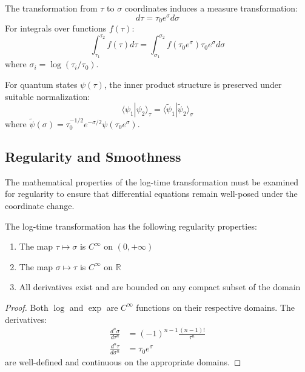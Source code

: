 \begin{theorem}
\label{thm:measure_transformation}
The transformation from $\tau$ to $\sigma$ coordinates induces a measure transformation:
\begin{equation}
d\tau = \tau_0 e^\sigma d\sigma
\end{equation}
For integrals over functions $f(\tau)$:
\begin{equation}
\int_{\tau_1}^{\tau_2} f(\tau) d\tau = \int_{\sigma_1}^{\sigma_2} f(\tau_0 e^\sigma) \tau_0 e^\sigma d\sigma
\end{equation}
where $\sigma_i = \log(\tau_i/\tau_0)$.
\end{theorem}

\begin{corollary}
For quantum states $\psi(\tau)$, the inner product structure is preserved under suitable normalization:
\begin{equation}
\langle \psi_1 | \psi_2 \rangle_\tau = \langle \tilde{\psi}_1 | \tilde{\psi}_2 \rangle_\sigma
\end{equation}
where $\tilde{\psi}(\sigma) = \tau_0^{-1/2} e^{-\sigma/2} \psi(\tau_0 e^\sigma)$.
\end{corollary}

\subsection{Regularity and Smoothness}
\label{subsec:regularity}

The mathematical properties of the log-time transformation must be examined for regularity to ensure that differential equations remain well-posed under the coordinate change.

\begin{theorem}
\label{thm:smoothness}
The log-time transformation has the following regularity properties:
\begin{enumerate}
\item The map $\tau \mapsto \sigma$ is $C^\infty$ on $(0,+\infty)$
\item The map $\sigma \mapsto \tau$ is $C^\infty$ on $\mathbb{R}$
\item All derivatives exist and are bounded on any compact subset of the domain
\end{enumerate}
\end{theorem}

\begin{proof}
Both $\log$ and $\exp$ are $C^\infty$ functions on their respective domains. The derivatives:
\begin{align}
\frac{d^n\sigma}{d\tau^n} &= (-1)^{n-1} \frac{(n-1)!}{\tau^n} \\
\frac{d^n\tau}{d\sigma^n} &= \tau_0 e^\sigma
\end{align}
are well-defined and continuous on the appropriate domains.
\end{proof}

